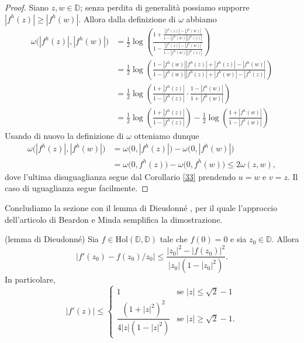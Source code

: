 \begin{proof}
  Siano $z, w \in \mathbb{D}$; senza perdita di generalità possiamo supporre $|f^h(z)| \ge |f^h(w)|$. Allora dalla definizione di $\omega$ abbiamo
  \begin{align*}
    \omega\bigl(|f^h(z)|, |f^h(w)|\bigr) & =\frac{1}{2}\log\left(\frac{1+\frac{|f^h(z)|-|f^h(w)|}{1-|f^h(w)||f^h(z)|}}{1-\frac{|f^h(z)|-|f^h(w)|}{1-|f^h(w)||f^h(z)|}}\right) \\
    & =\frac{1}{2}\log\left(\frac{1-|f^h(w)||f^h(z)|+|f^h(z)|-|f^h(w)|}{1-|f^h(w)||f^h(z)|+|f^h(w)|-|f^h(z)|}\right) \\
    & =\frac{1}{2}\log\left(\frac{1+|f^h(z)|}{1-|f^h(z)|}\cdot\frac{1-|f^h(w)|}{1+|f^h(w)|}\right) \\
    & =\frac{1}{2}\log\left(\frac{1+|f^h(z)|}{1-|f^h(z)|}\right)-\frac{1}{2}\log\left(\frac{1+|f^h(w)|}{1-|f^h(w)|}\right)
  \end{align*}
  Usando di nuovo la definizione di $\omega$ otteniamo dunque
  \begin{align*}
    \omega\bigl(|f^h(z)|, |f^h(w)|\bigr)&=\omega\bigl(0,|f^h(z)|\bigr)-\omega\bigl(0,|f^h(w)|\bigr) \\
    & =\omega\bigl(0,f^h(z)\bigr)-\omega\bigl(0,f^h(w)\bigr) \le 2\omega(z,w),
  \end{align*}
  dove l'ultima disuguaglianza segue dal Corollario \ref{33} prendendo $u=w$ e $v=z$. Il caso di uguaglianza segue facilmente.
\end{proof}

Concludiamo la sezione con il lemma di Dieudonné \cite[Chapitre III, paragraphe 8, équation (25)]{D}, per il quale l'approccio dell'articolo di Beardon e Minda semplifica la dimostrazione.

\begin{lm}
  (lemma di Dieudonné) Sia $f \in \text{Hol}(\mathbb{D},\mathbb{D})$ tale che $f(0)=0$ e sia $z_0 \in \mathbb{D}$. Allora
  \begin{equation} \label{dieu}
    |f'(z_0)-f(z_0)/z_0| \le \frac{|z_0|^2-|f(z_0)|^2}{|z_0|(1-|z_0|^2)}.
  \end{equation}
  In particolare,
  \begin{equation} \label{dieuprimo}
    |f'(z)| \le \begin{cases}
      1 & \mbox{se } |z| \le \sqrt{2}-1 \\
      \dfrac{(1+|z|^2)^2}{4|z|(1-|z|^2)} & \mbox{se } |z| \ge \sqrt{2}-1.
  \end{cases}
  \end{equation}
\end{lm}

